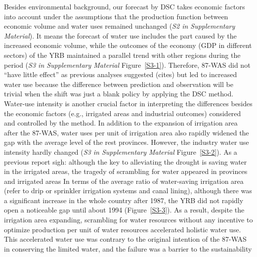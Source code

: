 \label{result-1-p2}
Besides environmental background, our forecast by DSC takes economic factors into account under the assumptions that the production function between economic volume and water uses remained unchanged (\textit{S2 in Supplementary Material}).
It means the forecast of water use includes the part caused by the increased economic volume, while the outcomes of the economy (GDP in different sectors) of the YRB maintained a parallel trend with other regions during the period (\textit{S3 in Supplementary Material} Figure~\ref{S3-1}).
Therefore, 87-WAS did not ``have little effect'' as previous analyses suggested (cites) but led to increased water use because the difference between prediction and observation will be trivial when the shift was just a blank policy by applying the DSC method. %
Water-use intensity is another crucial factor in interpreting the differences besides the economic factors (e.g., irrigated areas and industrial outcomes) considered and controlled by the method.
In addition to the expansion of irrigation area after the 87-WAS, water uses per unit of irrigation area also rapidly widened the gap with the average level of the rest provinces. However, the industry water use intensity hardly changed (\textit{S3 in Supplementary Material} Figure~\ref{S3-2}).
As a previous report sigh: although the key to alleviating the drought is saving water in the irrigated areas, the tragedy of scrambling for water appeared in provinces and irrigated areas %
In terms of the average ratio of water-saving irrigation area (refer to drip or sprinkler irrigation systems and canal lining), although there was a significant increase in the whole country after 1987, the YRB did not rapidly open a noticeable gap until about 1994 (Figure~\ref{S3-3}).
As a result, despite the irrigation area expanding, scrambling for water resources without any incentive to optimize production per unit of water resources accelerated holistic water use.
This accelerated water use was contrary to the original intention of the 87-WAS in conserving the limited water, and the failure was a barrier to the sustainability %

